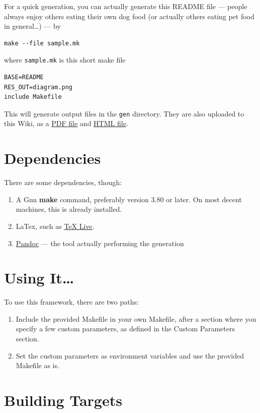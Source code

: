 \documentclass[oneside,]{memoir}
\begin{document}
For a quick generation, you can actually generate this README file ---
people always enjoy others eating their own dog food (or actually others
eating pet food in general\ldots{}) --- by

\begin{verbatim}
make --file sample.mk
\end{verbatim}
where \texttt{sample.mk} is this short make file

\begin{verbatim}
BASE=README
RES_OUT=diagram.png
include Makefile
\end{verbatim}
This will generate output files in the \texttt{gen} directory. They are
also uploaded to this Wiki, as a \href{./gen/README.pdf}{PDF file} and
\href{./gen/README.html}{HTML file}.

\section{Dependencies}

There are some dependencies, though:

\begin{enumerate}[1.]
\item
  A Gnu \textbf{make} command, preferably version 3.80 or later. On most
  decent machines, this is already installed.
\item
  LaTex, such as \href{http://www.tug.org/texlive/}{TeX Live}.
\item
  \href{http://johnmacfarlane.net/pandoc/}{Pandoc} --- the tool actually
  performing the generation
\end{enumerate}
\section{Using It\ldots{}}

To use this framework, there are two paths:

\begin{enumerate}[1.]
\item
  Include the provided Makefile in your own Makefile, after a section
  where you specify a few custom parameters, as defined in the Custom
  Parameters section.
\item
  Set the custom parameters as environment variables and use the
  provided Makefile as is.
\end{enumerate}
\section{Building Targets}
\end{document}
